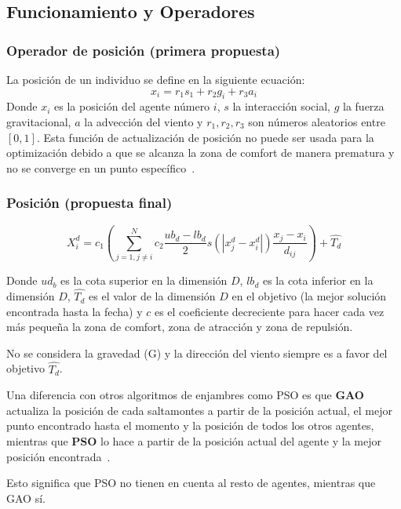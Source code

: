 \subsection{Funcionamiento y Operadores}
\subsubsection{Operador de posición (primera propuesta)}
La posición de un individuo se define en la siguiente ecuación:
\begin{equation}
    x_i = r_1s_1+r_2g_i+r_3a_i
\end{equation}
Donde $x_i$ es la posición del agente número $i$, $s$ la interacción social, $g$ la fuerza gravitacional, $a$ la advección del viento y $r_1, r_2, r_3$ son números aleatorios entre $[0,1]$.
Esta función de actualización de posición no puede ser usada para la optimización debido a que se alcanza la zona de comfort de manera prematura y no se converge en un punto específico~\cite{saremi_grasshopper_2017}.

\subsubsection{Posición (propuesta final)}

\begin{equation}
    X_i^d=c_1\left(\sum_{j=1,j\neq i}^N c_2\frac{ub_d-lb_d}{2}s(|x_j^d-x_i^d|)\frac{x_j-x_i}{d_{ij}}\right)+\hat{T_d}
    \label{eq:goa-position}
\end{equation}

Donde $ud_b$ es la cota superior en la dimensión $D$, $lb_d$ es la cota inferior en la dimensión $D$, $\hat{T_d}$ es el valor de la dimensión $D$ en el objetivo (la mejor solución encontrada hasta la fecha) y $c$ es el coeficiente decreciente para hacer cada vez más pequeña la zona de comfort, zona de atracción y zona de repulsión.

No se considera la gravedad (G) y la dirección del viento siempre es a favor del objetivo $\hat{T_d}$.

Una diferencia con otros algoritmos de enjambres como PSO es que \textbf{GAO} actualiza la posición de cada saltamontes a partir de la posición actual, el mejor punto encontrado hasta el momento y la posición de todos los otros agentes, mientras que \textbf{PSO} lo hace a partir de la posición actual del agente y la mejor posición encontrada~\cite{saremi_grasshopper_2017}.

Esto significa que PSO no tienen en cuenta al resto de agentes, mientras que GAO sí.

